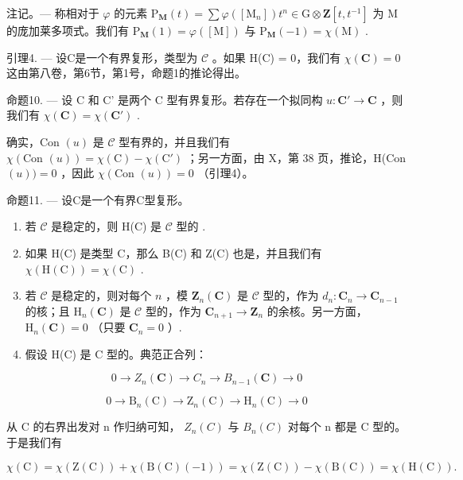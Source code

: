 注记。--- 称相对于 \(\varphi\) 的元素 \(\mathrm{P}_{\mathbf{M}}(t) = \sum \varphi([\mathrm{M}_{n}]) t^{n} \in \mathrm{G} \otimes \mathbf{Z}[t, t^{-1}]\) 为 M 的庞加莱多项式。我们有 \(\mathrm{P}_{\mathbf{M}}(1) = \varphi([\mathrm{M}])\) 与 \(\mathrm{P}_{\mathbf{M}}(-1) = \chi(\mathrm{M})\) .

引理4. --- 设C是一个有界复形，类型为 \(\mathcal{C}\) 。如果 H(C) = 0，我们有 \(\chi(\mathbf{C}) = 0\) 这由第八卷，第6节，第1号，命题1的推论得出。

命题10. --- 设 C 和 C' 是两个 C 型有界复形。若存在一个拟同构 \(u: \mathbf{C}' \to \mathbf{C}\) ，则我们有 \(\chi(\mathbf{C}) = \chi(\mathbf{C}')\) .

确实，Con \((u)\) 是 \(\mathcal{C}\) 型有界的，并且我们有 \(\chi(\text{Con } (u)) = \chi(\text{C}) - \chi(\text{C}')\) ；另一方面，由 X，第 38 页，推论，H(Con \((u)) = 0\) ，因此 \(\chi(\text{Con } (u)) = 0\) （引理4）。

命题11. --- 设C是一个有界C型复形。

\begin{enumerate}
\def\labelenumi{\alph{enumi})}
\item
  若 \(\mathcal{C}\) 是稳定的，则 H(C) 是 \(\mathcal{C}\) 型的 .
\item
  如果 H(C) 是类型 C，那么 B(C) 和 Z(C) 也是，并且我们有 \(\chi(\mathrm{H}(\mathrm{C})) = \chi(\mathrm{C})\) .
\item
  若 \(\mathcal{C}\) 是稳定的，则对每个 \(n\) ，模 \(\mathbf{Z}_n(\mathbf{C})\) 是 \(\mathcal{C}\) 型的，作为 \(d_n: \mathbf{C}_n \to \mathbf{C}_{n-1}\) 的核；且 \(\mathrm{H}_n(\mathbf{C})\) 是 \(\mathcal{C}\) 型的，作为 \(\mathbf{C}_{n+1} \to \mathbf{Z}_n\) 的余核。另一方面， \(\mathrm{H}_n(\mathbf{C}) = 0\) （只要 \(\mathbf{C}_n = 0\) ）.
\item
  假设 H(C) 是 C 型的。典范正合列：
\end{enumerate}

\[
0 \to Z _ {n} (\mathbf {C}) \to C _ {n} \to B _ {n - 1} (\mathbf {C}) \to 0
\]

\[
0 \to \mathrm{B} _ {n} (\mathrm{C}) \to \mathrm{Z} _ {n} (\mathrm{C}) \to \mathrm{H} _ {n} (\mathrm{C}) \to 0
\]

从 C 的右界出发对 n 作归纳可知， \(Z_{n}(C)\) 与 \(B_{n}(C)\) 对每个 n 都是 C 型的。于是我们有

\[
\chi (\mathrm{C}) = \chi (\mathrm{Z} (\mathrm{C})) + \chi (\mathrm{B} (\mathrm{C}) (- 1)) = \chi (\mathrm{Z} (\mathrm{C})) - \chi (\mathrm{B} (\mathrm{C})) = \chi (\mathrm{H} (\mathrm{C})).
\]

